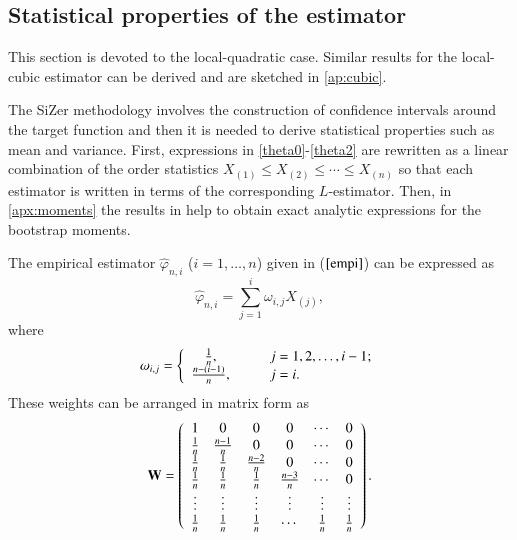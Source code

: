 \documentclass[preprint,12pt]{elsarticle}
\begin{document}
\subsection{Statistical properties of the estimator}\label{stat_prop}
This section is devoted to the local-quadratic case. Similar results for the local-cubic estimator can be derived and are sketched in \ref{ap:cubic}.

The SiZer methodology involves the construction of confidence intervals around the target function and then it is needed to derive statistical properties such as mean and variance. First, expressions in \eqref{theta0}-\eqref{theta2} are rewritten as a linear combination of the order statistics $X_{(1)} \leq X_{(2)} \leq \cdots \leq X_{(n)}$ so that each estimator is written in terms of the corresponding $L$-estimator. Then, in \ref{apx:moments} the results in \cite{HE2000} help to obtain exact analytic expressions for the bootstrap moments.
 
The empirical estimator $\widehat{\varphi}_{n,i}$ ($i=1,\ldots,n$) given in ($\ref{empi}$) can be expressed as
\begin{equation}\label{empi_2}
\widehat{\varphi}_{n,i}=\sum_{j=1}^i\omega_{i,j} X_{(j)},
\end{equation}
where
\begin{equation}\label{eq:omega}
\omega_{i,j}=\left\{\begin{array}{cll} 
\frac{1}{n}, & \hspace{0.3cm}& j= 1,2, \ldots, i-1; \\
\frac{n-(i-1)}{n},& \hspace{0.3cm}& j= i. \\
\end{array}\right.
\end{equation}
These weights can be arranged in matrix form  as 
\[
{\bf W} =\left(
\begin{array}{cccccc}
1 & 0 &0 &0& \cdots &0 \\
\frac{1}{n} & \frac{n-1}{n}&0&0&\cdots& 0 \\
\frac{1}{n} & \frac{1}{n}&\frac{n-2}{n}&0&\cdots& 0 \\
\frac{1}{n} & \frac{1}{n}&\frac{1}{n}&\frac{n-3}{n}&\cdots& 0 \\
\vdots&\vdots&\vdots&\vdots&\vdots&\vdots \\
\frac{1}{n} & \frac{1}{n}&\frac{1}{n}&\cdots&\frac{1}{n}& \frac{1}{n} \\
\end{array}
\right).
\]
\end{document}
